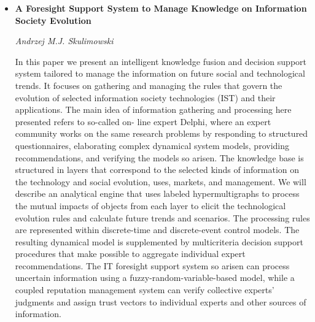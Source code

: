 \documentclass[a4paper,12pt,svgnames]{report}
\begin{document}
\begin{itemize}
\item \textbf{A Foresight Support System to Manage Knowledge on Information
Society Evolution}

\textit{Andrzej M.J. Skulimowski}

In this paper we present an intelligent knowledge fusion and decision support
system tailored to manage the information on future social and technological
trends. It focuses on gathering and managing the rules that govern the evolution
of selected information society technologies (IST) and their applications. The
main idea of information gathering and processing here presented refers to
so-called on- line expert Delphi, where an expert community works on the same
research problems by responding to structured questionnaires, elaborating
complex dynamical system models, providing recommendations, and verifying the
models so arisen. The knowledge base is structured in layers that correspond to
the selected kinds of information on the technology and social evolution, uses,
markets, and management. We will describe an analytical engine that uses labeled
hypermultigraphs to process the mutual impacts of objects from each layer to
elicit the technological evolution rules and calculate future trends and
scenarios. The processing rules are represented within discrete-time and
discrete-event control models. The resulting dynamical model is supplemented by
multicriteria decision support procedures that make possible to aggregate
individual expert recommendations. The IT foresight support system so arisen can
process uncertain information using a fuzzy-random-variable-based model, while a
coupled reputation management system can verify collective experts’ judgments
and assign trust vectors to individual experts and other sources of information.
\end{itemize}
\end{document}

